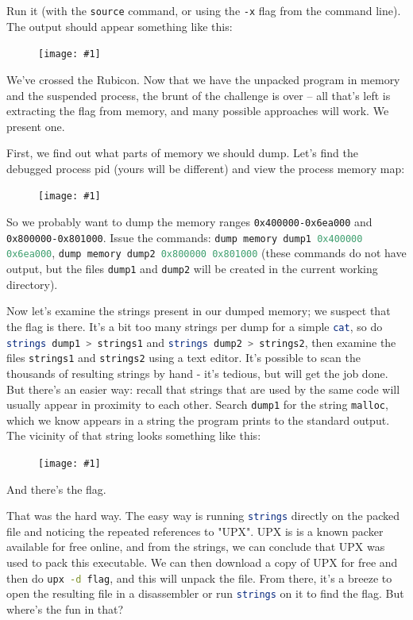 \documentclass{article}
\newcommand{\displayimage}[1] {
\begin{figure}[H]
    \centering
    \texttt{[image: \#1]} 
\end{figure}
}
\newcommand{\xcode}[2]{\colorbox{ubuntuback}{\lstinline[language=#1]|#2|}}
\newcommand{\code}[1]{\colorbox{ubuntuback}{\texttt{#1}}}
\newcommand{\gdb}[1]{\xcode{C}{#1}}
\begin{document}
Run it (with the \gdb{source} command, or using the \xcode{bash}{-x} flag from the command line). The output should appear something like this:

\displayimage{../03_flag/unpacked_code.png}

We've crossed the Rubicon. Now that we have the unpacked program in memory and the suspended process, the brunt of the challenge is over -- all that's left is extracting the flag from memory, and many possible approaches will work. We present one.

First, we find out what parts of memory we should dump. Let's find the debugged process pid (yours will be different) and view the process memory map:

\displayimage{../03_flag/memory_map.png}

So we probably want to dump the memory ranges \code{0x400000-0x6ea000} and \code{0x800000-0x801000}. Issue the commands: \gdb{dump memory dump1 0x400000 0x6ea000}, \gdb{dump memory dump2 0x800000 0x801000} (these commands do not have output, but the files \xcode{bash}{dump1} and \xcode{bash}{dump2} will be created in the current working directory).

Now let's examine the strings present in our dumped memory; we suspect that the flag is there. It's a bit too many strings per dump for a simple \xcode{bash}{cat}, so do \xcode{bash}{strings dump1 > strings1} and \xcode{bash}{strings dump2 > strings2}, then examine the files \code{strings1} and \code{strings2} using a text editor. It's possible to scan the thousands of resulting strings by hand - it's tedious, but will get the job done. But there's an easier way: recall that strings that are used by the same code will usually appear in proximity to each other. Search \code{dump1} for the string \code{malloc}, which we know appears in a string the program prints to the standard output. The vicinity of that string looks something like this:

\displayimage{../03_flag/bingo.png}

And there's the flag.

That was the hard way. The easy way is running \xcode{bash}{strings} directly on the packed file and noticing the repeated references to "UPX". UPX is is a known packer available for free online, and from the strings, we can conclude that UPX was used to pack this executable. We can then download a copy of UPX for free and then do \xcode{bash}{upx -d flag}, and this will unpack the file. From there, it's a breeze to open the resulting file in a disassembler or run \xcode{bash}{strings} on it to find the flag. But where's the fun in that?
\end{document}
